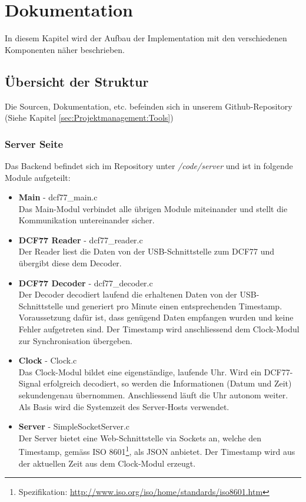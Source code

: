 
\chapter{Dokumentation}
In diesem Kapitel wird der Aufbau der Implementation mit den verschiedenen Komponenten näher beschrieben.

\section{Übersicht der Struktur}
Die Sourcen, Dokumentation, etc. befeinden sich in unserem Github-Repository (Siehe Kapitel \ref{sec:Projektmanagement:Tools})
\subsection{Server Seite}
Das Backend befindet sich im Repository unter \textit{/code/server} und ist in folgende Module aufgeteilt:

\begin{itemize}
\item {\textbf{Main} - dcf77\_main.c} \\
Das Main-Modul verbindet alle übrigen Module miteinander und stellt die Kommunikation untereinander sicher.

\item {\textbf{DCF77 Reader} - dcf77\_reader.c} \\
Der Reader liest die Daten von der USB-Schnittstelle zum DCF77 und übergibt diese dem Decoder.

\item {\textbf{DCF77 Decoder} - dcf77\_decoder.c}\\
Der Decoder decodiert laufend die erhaltenen Daten von der USB-Schnittstelle und generiert pro Minute einen entsprechenden Timestamp. Voraussetzung dafür ist, dass  genügend Daten empfangen wurden und keine Fehler aufgetreten sind. Der Timestamp wird anschliessend dem Clock-Modul zur Synchronisation übergeben.

\item {\textbf{Clock} - Clock.c}\\
Das Clock-Modul bildet eine eigenständige, laufende Uhr. Wird ein DCF77-Signal erfolgreich decodiert, so werden die Informationen (Datum und Zeit) sekundengenau übernommen. Anschliessend läuft die Uhr autonom weiter. Als Basis wird die Systemzeit des Server-Hosts verwendet.


\item {\textbf{Server} - SimpleSocketServer.c}\\
Der Server bietet eine Web-Schnittstelle via Sockets an, welche den Timestamp, gemäss ISO 8601\footnote{Spezifikation: \url{http://www.iso.org/iso/home/standards/iso8601.htm}}, als JSON anbietet. Der Timestamp wird aus der aktuellen Zeit aus dem Clock-Modul erzeugt.

\end{itemize} 

